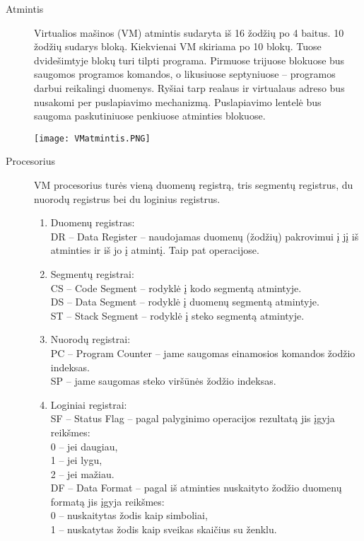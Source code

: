 \begin{description}
\item[Atmintis] \leavevmode 

Virtualios mašinos (VM) atmintis sudaryta iš 16 žodžių po 4 baitus. 10 žodžių sudarys bloką. Kiekvienai VM skiriama po 10 blokų. Tuose dvidešimtyje blokų turi tilpti programa.
Pirmuose trijuose blokuose bus saugomos programos komandos, o likusiuose septyniuose – programos darbui reikalingi duomenys.
Ryšiai tarp realaus ir virtualaus adreso bus nusakomi per puslapiavimo mechanizmą. Puslapiavimo lentelė bus saugoma paskutiniuose penkiuose atminties blokuose.


\texttt{[image: VMatmintis.PNG]}

\item[Procesorius]  \leavevmode 
  
VM procesorius turės vieną duomenų registrą, tris segmentų registrus, du nuorodų registrus bei du loginius registrus.
\begin{enumerate}
\item Duomenų registras:\leavevmode \\
DR – Data Register – naudojamas duomenų (žodžių) pakrovimui į jį iš atminties ir iš jo į atmintį. Taip pat operacijose.
\item Segmentų registrai:\leavevmode \\
CS – Code Segment – rodyklė į kodo segmentą atmintyje.\\
DS – Data Segment – rodyklė į duomenų segmentą atmintyje.\\
ST – Stack Segment – rodyklė į steko segmentą atmintyje.
\item Nuorodų registrai:\leavevmode \\
PC – Program Counter – jame saugomas einamosios komandos žodžio indeksas.\\
SP – jame saugomas steko viršūnės žodžio indeksas.
\item Loginiai registrai:\leavevmode \\
SF – Status Flag – pagal palyginimo operacijos rezultatą jis įgyja reikšmes:  \\ 0 – jei daugiau,\\ 1 – jei lygu, \\2 – jei mažiau.\\
DF – Data Format – pagal iš atminties nuskaityto žodžio duomenų formatą jis įgyja reikšmes: \\0 – nuskaitytas žodis kaip simboliai,\\ 1 – nuskatytas žodis kaip sveikas skaičius su ženklu.

\end{enumerate}
\end{description}
